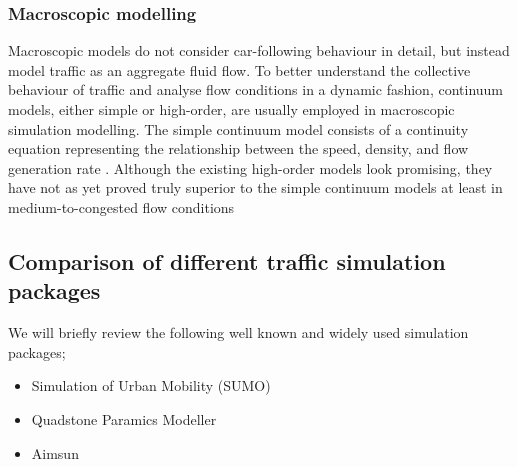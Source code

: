 \subsubsection{Macroscopic modelling}
	Macroscopic models do not consider car-following behaviour in detail, but instead model traffic as an aggregate fluid flow. To better understand the collective behaviour of traffic and analyse flow conditions in a dynamic fashion, continuum models, either simple or high-order, are usually employed in macroscopic simulation modelling. The simple continuum model consists of a continuity equation representing the relationship between the speed, density, and flow generation rate \cite{ross1988some}. Although the existing high-order models look promising, they have not as yet proved truly superior to the simple continuum models at least in medium-to-congested flow conditions\cite{michalopoulos1991enhancement}
\subsection{Comparison of different traffic simulation packages}
	We will briefly review the following well known and widely used simulation packages;
	
	\begin{itemize}
		\item Simulation of Urban Mobility (SUMO)
		\item Quadstone Paramics Modeller
		\item Aimsun
	\end{itemize}

